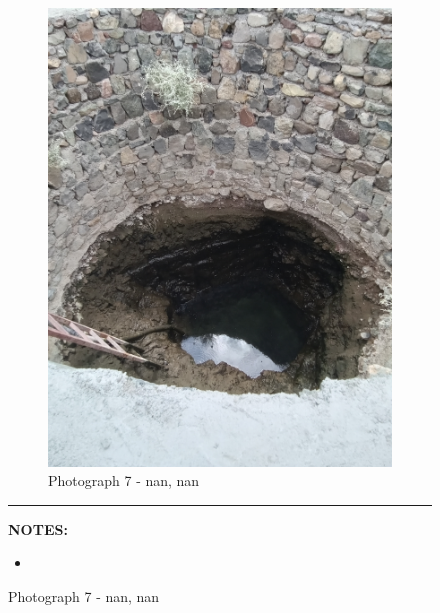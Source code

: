 \documentclass[12pt, letterpaper]{article}
\begin{document}
\begin{figure}[h]
{{                \begin{subfigure}{\linewidth}
                    \centering
                    \includegraphics[width=0.37\textheight, angle=-90]{photos/4.png}
                    \captionsetup{width=0.8\linewidth}
                    \caption{Photograph 7 - nan, nan}
                \end{subfigure}
                    \vspace{1mm}
                    \hrule
                \begin{minipage}[c][4.5cm][t]{1\textwidth} 
                    \begin{minipage}[t][2cm][t]{0.5\textwidth} 
	 				\vspace{2mm}
					\centering
					\textbf{\small{NOTES:}} \\ 
					\raggedright 
					\begin{itemize}
            					\item \footnotesize{}
       				 	\end{itemize}

\end{minipage}
\end{minipage}}}
\end{figure}
\end{document}
